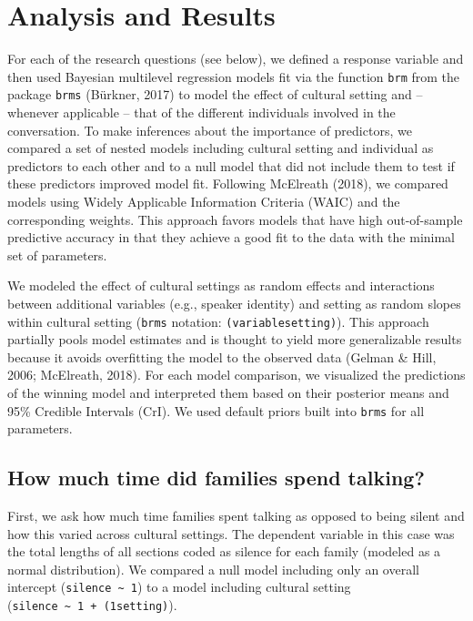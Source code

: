 \documentclass[
  man,floatsintext]{apa6}
\begin{document}
\hypertarget{analysis-and-results}{%
\section{Analysis and Results}\label{analysis-and-results}}

For each of the research questions (see below), we defined a response variable and then used Bayesian multilevel regression models fit via the function \texttt{brm} from the package \texttt{brms} (Bürkner, 2017) to model the effect of cultural setting and -- whenever applicable -- that of the different individuals involved in the conversation. To make inferences about the importance of predictors, we compared a set of nested models including cultural setting and individual as predictors to each other and to a null model that did not include them to test if these predictors improved model fit. Following McElreath (2018), we compared models using Widely Applicable Information Criteria (WAIC) and the corresponding weights. This approach favors models that have high out-of-sample predictive accuracy in that they achieve a good fit to the data with the minimal set of parameters.

We modeled the effect of cultural settings as random effects and interactions between additional variables (e.g., speaker identity) and setting as random slopes within cultural setting (\texttt{brms} notation: \texttt{(variable\textbar{}setting)}). This approach partially pools model estimates and is thought to yield more generalizable results because it avoids overfitting the model to the observed data (Gelman \& Hill, 2006; McElreath, 2018). For each model comparison, we visualized the predictions of the winning model and interpreted them based on their posterior means and 95\% Credible Intervals (CrI). We used default priors built into \texttt{brms} for all parameters.

\hypertarget{how-much-time-did-families-spend-talking}{%
\subsection{How much time did families spend talking?}\label{how-much-time-did-families-spend-talking}}

First, we ask how much time families spent talking as opposed to being silent and how this varied across cultural settings. The dependent variable in this case was the total lengths of all sections coded as silence for each family (modeled as a normal distribution). We compared a null model including only an overall intercept (\texttt{silence\ \textasciitilde{}\ 1}) to a model including cultural setting (\texttt{silence\ \textasciitilde{}\ 1\ +\ (1\textbar{}setting)}).
\end{document}
